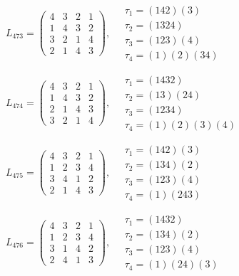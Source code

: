 $L_{473} = \begin{pmatrix} 4 & 3 & 2 & 1 \\ 1 & 4 & 3 & 2 \\ 3 & 2 & 1 & 4 \\ 2 & 1 & 4 & 3 \end{pmatrix}, \quad \begin{matrix} \tau_{1} = (1 4 2)(3) \\ \tau_{2} = (1 3 2 4) \\ \tau_{3} = (1 2 3)(4) \\ \tau_{4} = (1)(2)(3 4) \end{matrix}$

$L_{474} = \begin{pmatrix} 4 & 3 & 2 & 1 \\ 1 & 4 & 3 & 2 \\ 2 & 1 & 4 & 3 \\ 3 & 2 & 1 & 4 \end{pmatrix}, \quad \begin{matrix} \tau_{1} = (1 4 3 2) \\ \tau_{2} = (1 3)(2 4) \\ \tau_{3} = (1 2 3 4) \\ \tau_{4} = (1)(2)(3)(4) \end{matrix}$

$L_{475} = \begin{pmatrix} 4 & 3 & 2 & 1 \\ 1 & 2 & 3 & 4 \\ 3 & 4 & 1 & 2 \\ 2 & 1 & 4 & 3 \end{pmatrix}, \quad \begin{matrix} \tau_{1} = (1 4 2)(3) \\ \tau_{2} = (1 3 4)(2) \\ \tau_{3} = (1 2 3)(4) \\ \tau_{4} = (1)(2 4 3) \end{matrix}$

$L_{476} = \begin{pmatrix} 4 & 3 & 2 & 1 \\ 1 & 2 & 3 & 4 \\ 3 & 1 & 4 & 2 \\ 2 & 4 & 1 & 3 \end{pmatrix}, \quad \begin{matrix} \tau_{1} = (1 4 3 2) \\ \tau_{2} = (1 3 4)(2) \\ \tau_{3} = (1 2 3)(4) \\ \tau_{4} = (1)(2 4)(3) \end{matrix}$

